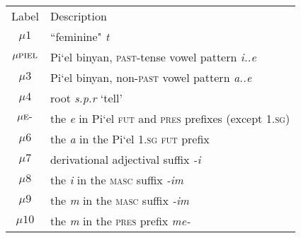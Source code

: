 \begin{figure}
\begin{center}
\begin{tabular}{cl}
Label & Description \\
$\mu1$ & ``feminine" \textit{t} \\
$\mu\textsc{piel}$ & Pi`el binyan, \textsc{past}-tense vowel pattern \textit{i..e} \\
$\mu3$ & Pi`el binyan, non-\textsc{past} vowel pattern \textit{a..e}\\
$\mu4$ & root \textit{s.p.r} `tell' \\
$\mu\textsc{e}\text{-}$ & the \textit{e} in Pi`el \textsc{fut} and \textsc{pres} prefixes (except 1.\textsc{sg}) \\
$\mu6$ & the \textit{a} in the Pi`el 1.\textsc{sg} \textsc{fut} prefix \\
$\mu7$ &  derivational adjectival suffix \textit{-i} \\
$\mu8$ & the \textit{i} in the \textsc{masc} suffix \textit{-im} \\
$\mu9$ & the \textit{m} in the \textsc{masc} suffix \textit{-im} \\
$\mu10$ & the \textit{m} in the \textsc{pres} prefix \textit{me-} \\
\end{tabular}
\end{center}
\label{fig:morphome-key}
\end{figure}
